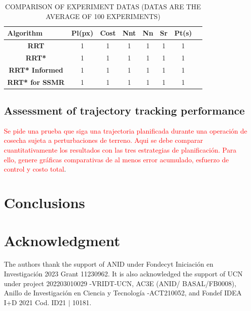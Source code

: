\documentclass[conference]{IEEEtran}
\newcommand{\revJ}[1]{\textcolor{red}{#1}}
\begin{document}
\begin{table}[t!]
\centering

\caption{COMPARISON OF EXPERIMENT DATAS (DATAS ARE THE AVERAGE OF 100 EXPERIMENTS)}
\label{Table::results_rrt}
\begin{tabular}{@{}ccllcllccccc@{}}
\toprule
\multicolumn{1}{l}{\textbf{Algorithm}} & \multicolumn{3}{c}{\textbf{Pl(px)}} & \textbf{Cost} & \multicolumn{3}{c}{\textbf{Nnt}} & \textbf{Nn} & \textbf{Sr}  & \textbf{Pt(s)} \\ \midrule \midrule
\textbf{RRT} & \multicolumn{3}{c}{1} & \multicolumn{3}{c}{1} & 1 & 1 & 1 & 1\\
\textbf{RRT*} & \multicolumn{3}{c}{1} & \multicolumn{3}{c}{1} & 1 & 1 &  1 & 1 \\
\textbf{RRT* Informed} & \multicolumn{3}{c}{1} & \multicolumn{3}{c}{1} & 1 & 1  & 1 & 1 \\ 
\textbf{RRT* for SSMR} & \multicolumn{3}{c}{1} & \multicolumn{3}{c}{1} & 1 & 1 & 1 & 1 \\ \bottomrule
\end{tabular}
\end{table}

\subsection{Assessment of trajectory tracking performance}
\label{Sec::test3}

\revJ{Se pide una prueba que siga una trajectoria planificada durante una operación de cosecha sujeta a perturbaciones de terreno. Aqui se debe comparar cuantitativamente los resultados con las tres estrategias de planificación. Para ello, genere gráficas comparativas de al menos error acumulado, esfuerzo de control y costo total}.

\section{Conclusions}
\label{Sec::conclusions}

\section*{Acknowledgment}
The authors thank the support of ANID under Fondecyt Iniciaci\'on en Investigaci\'on 2023 Grant 11230962. It is also acknowledged the support of UCN under project 202203010029 -VRIDT-UCN, AC3E (ANID/ BASAL/FB0008), Anillo de Investigación en Ciencia y Tecnología -ACT210052, and Fondef IDEA I+D 2021 Cod. ID21 $\vert$ 10181.



\vspace{12pt}
\end{document}
